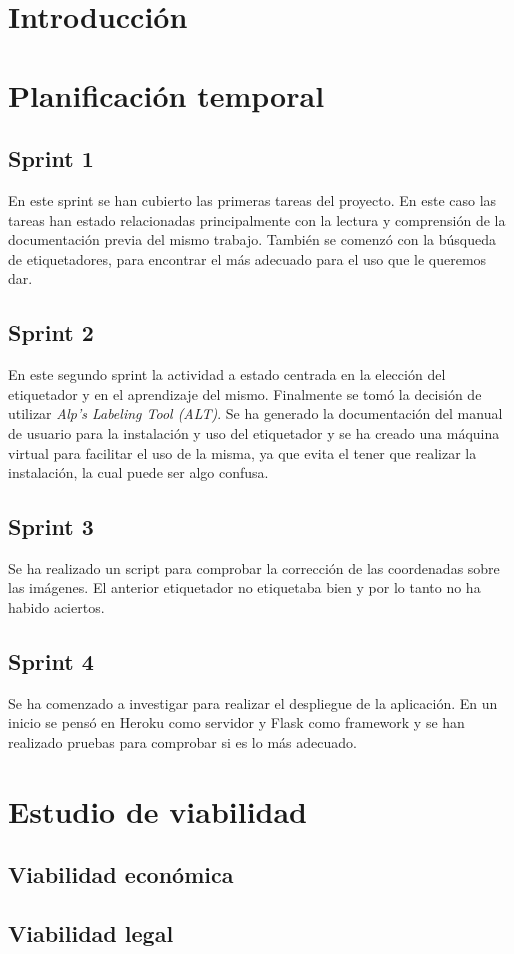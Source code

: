 
\section{Introducción}

\section{Planificación temporal}
\subsection{Sprint 1}
En este sprint se han cubierto las primeras tareas del proyecto. En este caso las tareas han estado relacionadas principalmente con la lectura y comprensión de la documentación previa del mismo trabajo.
También se comenzó con la búsqueda de etiquetadores, para encontrar el más adecuado para el uso que le queremos dar.
\subsection{Sprint 2}
En este segundo sprint la actividad a estado centrada en la elección del etiquetador y en el aprendizaje del mismo. Finalmente se tomó la decisión de utilizar \textit{Alp’s Labeling Tool (ALT)}. 
Se ha generado la documentación del manual de usuario para la instalación y uso del etiquetador y se ha creado una máquina virtual para facilitar el uso de la misma, ya que evita el tener que realizar la instalación, la cual puede ser algo confusa.
\subsection{Sprint 3}
Se ha realizado un script para comprobar la corrección de las coordenadas sobre las imágenes. El anterior etiquetador no etiquetaba bien y por lo tanto no ha habido aciertos.
\subsection{Sprint 4}
Se ha comenzado a investigar para realizar el despliegue de la aplicación. En un inicio se pensó en Heroku como servidor y Flask como framework y se han realizado pruebas para comprobar si es lo más adecuado. 
\section{Estudio de viabilidad}

\subsection{Viabilidad económica}

\subsection{Viabilidad legal}


